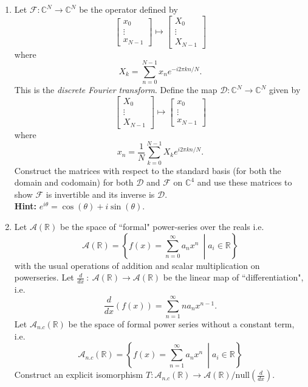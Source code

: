 \documentclass[12pt,letterpaper]{article}
\theoremstyle{plain}
\theoremstyle{definition}
\begin{document}
\begin{enumerate}[{\bf1.}]
\item Let $\mathcal{F}:\mathbb{C}^N\rightarrow \mathbb{C}^N$ be the operator defined by 
\[\begin{bmatrix}x_0\\ \vdots\\ x_{N-1}\end{bmatrix} \mapsto \begin{bmatrix}X_0\\ \vdots\\ X_{N-1}\end{bmatrix}\]
where 
\[X_k=\sum_{n=0}^{N-1}x_ne^{-i2\pi kn/ N}.\]
This is the \emph{discrete Fourier transform}. Define the map $\mathcal{D}:\mathbb{C}^N\rightarrow \mathbb{C}^N$ given by
\[\begin{bmatrix}X_0\\ \vdots\\ X_{N-1}\end{bmatrix}\mapsto \begin{bmatrix}x_0\\ \vdots\\ x_{N-1}\end{bmatrix}\]
where 
\[x_n=\frac{1}{N}\sum_{k=0}^{N-1}X_ke^{i2\pi kn/ N}.\]
Construct the matrices with respect to the standard basis (for both the domain and codomain) for both $\mathcal{D}$ and $\mathcal{F}$ on $\mathbb{C}^4$ and use these matrices to show $\mathcal{F}$ is invertible and its inverse is $\mathcal{D}$. \\

{\bf \noindent Hint: }$e^{i\theta}=\cos(\theta)+i\sin(\theta)$.\\

\item Let $\mathcal{A}(\mathbb{R})$ be the space of ``formal" power-series over the reals i.e. 
\[\mathcal{A}(\mathbb{R})=\left\{f(x)=\sum_{n=0}^\infty a_nx^n\ \middle| a_i\in\mathbb{R}\right\} \]
with the usual operations of addition and scalar multiplication on powerseries. 
Let $\frac{d}{dx}~:~\mathcal{A}(\mathbb{R})\rightarrow \mathcal{A}(\mathbb{R})$ be the linear map of  ``differentiation", i.e. 
\[\frac{d}{dx}(f(x))=\sum_{n=1}^\infty na_nx^{n-1}.\]
Let $\mathcal{A}_{n.c}(\mathbb{R})$ be the space of formal power series without a constant term, i.e. 
\[\mathcal{A}_{n.c}(\mathbb{R})=\left\{f(x)=\sum_{n=1}^\infty a_nx^n\ \middle| a_i\in\mathbb{R}\right\} \]
Construct an explicit isomorphism $T:\mathcal{A}_{n.c}(\mathbb{R})\rightarrow\mathcal{A}(\mathbb{R})/\text{null}(\frac{d}{dx})$.\\


\end{enumerate}
\end{document}
